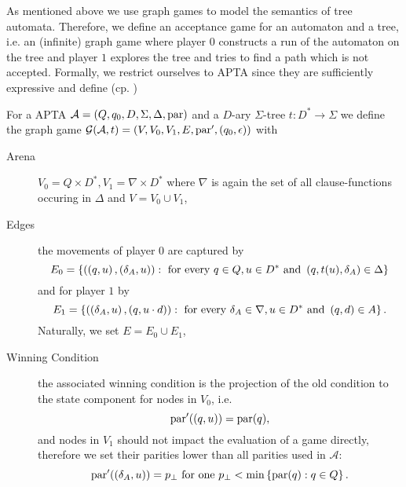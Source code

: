 As mentioned above we use graph games to model the semantics of tree automata.
Therefore, we define an acceptance game for an automaton and a tree, i.e. an 
(infinite) graph game where player $0$ constructs a run of the automaton on the
tree and player $1$ explores the tree and tries to find a path which is
not accepted. Formally, we restrict ourselves to \ac{APTA} since they are 
sufficiently expressive and define (cp. \cite{treeautosurvey,AltTreeAuto})
\begin{definition}
  For a \ac{APTA} $\mathcal{A} = \left(Q, q_{0}, D, \Sigma, \Delta, \operatorname{par}\right)$
  and a $D$-ary $\Sigma$-tree $t:D^{*}\rightarrow\Sigma$ we define the graph 
  game $\mathcal{G}(\mathcal{A}, t) = \left(V, V_{0}, V_{1}, E, 
  \operatorname{par}', \left(q_{0},\epsilon\right)\right)$ with
  \begin{description}
    \item [Arena] 
      $V_{0} = Q\times D^{*},V_{1} = \nabla\times D^{*}$ where $\nabla$ is 
      again the set of all clause-functions occuring in $\Delta$ and 
      $V = V_{0}\cup V_{1}$,
    \item [Edges] 
      the movements of player $0$ are captured by
      \begin{equation*}
        E_{0} = \left\{
          \left(\left(q, u\right),\left(\delta_{A}, u\right)\right):\text{ for every }
          q\in Q,u\in D^{*}\text{ and }\left(q, t(u), \delta_{A}\right)\in\Delta
        \right\}
      \end{equation*}
      and for player $1$ by
      \begin{equation*}
        E_{1} = \left\{
          \left(\left(\delta_{A}, u\right), \left(q, u\cdot d\right)\right):\text{ for every }
          \delta_{A}\in\nabla, u\in D^{*}\text{ and }\left(q,d\right)\in A
        \right\}.
      \end{equation*}
      Naturally, we set $E = E_{0}\cup E_{1}$,
    \item [Winning Condition]
      the associated winning condition is the projection of the old 
      condition to the state component for nodes in $V_{0}$, i.e.
      \begin{equation*}
        \operatorname{par}'(\left(q, u\right)) = \operatorname{par}(q),
      \end{equation*}
      and nodes in $V_{1}$ should not impact the evaluation of a game directly, 
      therefore we set their parities lower than all parities used in 
      $\mathcal{A}$:
      \begin{equation*}
        \operatorname{par}'(\left(\delta_{A}, u\right)) = p_{\bot}
        \text{ for one }p_{\bot} < \min\left\{\operatorname{par}(q):q\in Q\right\}.
      \end{equation*}
  \end{description}
\end{definition}
